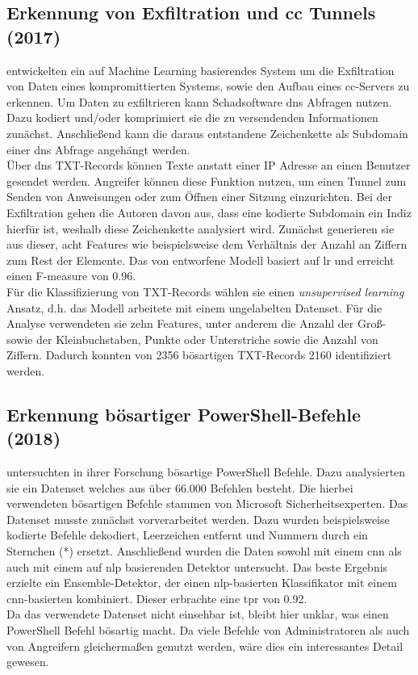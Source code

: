 \documentclass[
    12pt, %
    DIV10,
    ngerman, %
    a4paper, %
    oneside, %
    titlepage, %
    parskip=half, %
    headings=normal, %
    listof=totoc, %
    bibliography=totoc, %
    index=totoc, %
    captions=tableheading, %
    final %
]{scrreprt}
\begin{document}
\subsection{Erkennung von Exfiltration und \acs{cc} Tunnels (2017)}
\textcite{Das2018} entwickelten ein auf Machine Learning basierendes System um die Exfiltration von Daten eines kompromittierten Systems, sowie den Aufbau eines \ac{cc}-Servers zu erkennen. Um Daten zu exfiltrieren kann Schadsoftware \ac{dns} Abfragen nutzen. Dazu kodiert und/oder komprimiert sie die zu versendenden Informationen zunächst. Anschlie{\ss}end kann die daraus entstandene Zeichenkette als Subdomain einer \ac{dns} Abfrage angehängt werden.\\
Über \ac{dns} TXT-Records können Texte anstatt einer IP Adresse an einen Benutzer gesendet werden. Angreifer können diese Funktion nutzen, um einen Tunnel zum Senden von Anweisungen oder zum Öffnen einer Sitzung einzurichten.
Bei der Exfiltration gehen die Autoren davon aus, dass eine kodierte Subdomain ein Indiz hierfür ist, weshalb diese Zeichenkette analysiert wird. Zunächst generieren sie aus dieser, acht Features wie beispielsweise dem Verhältnis der Anzahl an Ziffern zum Rest der Elemente. Das von \textcite{Das2018} entworfene Modell basiert auf \acl{lr} und erreicht einen F-measure von 0.96.\\
Für die Klassifizierung von TXT-Records wählen sie einen \emph{unsupervised learning} Ansatz, d.h. das Modell arbeitete mit einem ungelabelten Datenset. Für die Analyse verwendeten sie zehn Features, unter anderem die Anzahl der Gro{\ss}- sowie der Kleinbuchstaben, Punkte oder Unterstriche sowie die Anzahl von Ziffern. Dadurch konnten von 2356 bösartigen TXT-Records 2160 identifiziert werden.
%
\subsection{Erkennung bösartiger PowerShell-Befehle (2018)}
\textcite{Hendler2018} untersuchten in ihrer Forschung bösartige PowerShell Befehle. Dazu analysierten sie ein Datenset welches aus über 66.000 Befehlen besteht. Die hierbei verwendeten bösartigen Befehle stammen von Microsoft Sicherheitsexperten.  Das Datenset musste zunächst vorverarbeitet werden. Dazu wurden beispielsweise kodierte Befehle dekodiert, Leerzeichen entfernt und Nummern durch ein Sternchen (*) ersetzt. Anschlie{\ss}end wurden die Daten sowohl mit einem \ac{cnn} als auch mit einem auf \ac{nlp} basierenden Detektor untersucht. Das beste Ergebnis erzielte ein Ensemble-Detektor, der einen \ac{nlp}-basierten Klassifikator mit einem \ac{cnn}-basierten kombiniert. Dieser erbrachte eine \ac{tpr} von 0.92.\\
Da das verwendete Datenset nicht einsehbar ist, bleibt hier unklar, was einen PowerShell Befehl bösartig macht. Da viele Befehle von Administratoren als auch von Angreifern gleicherma{\ss}en genutzt werden, wäre dies ein interessantes Detail gewesen.
%
\end{document}
